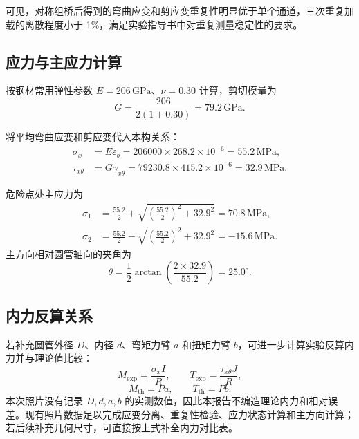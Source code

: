 \documentclass[UTF8,a4paper,10pt]{ctexart}
\begin{document}
可见，对称组桥后得到的弯曲应变和剪应变重复性明显优于单个通道，三次重复加载的离散程度小于 1\%，满足实验指导书中对重复测量稳定性的要求。

\subsection{应力与主应力计算}

按钢材常用弹性参数 $E=206\,\mathrm{GPa}$、$\nu=0.30$ 计算，剪切模量为
\begin{equation}
    G=\frac{206}{2(1+0.30)}=79.2\,\mathrm{GPa}.
\end{equation}

将平均弯曲应变和剪应变代入本构关系：
\begin{align}
    \sigma_x &= E\varepsilon_b
    =206000\times 268.2\times10^{-6}
    =55.2\,\mathrm{MPa},\\
    \tau_{x\theta} &= G\gamma_{x\theta}
    =79230.8\times 415.2\times10^{-6}
    =32.9\,\mathrm{MPa}.
\end{align}

危险点处主应力为
\begin{align}
    \sigma_1
    &=\frac{55.2}{2}+\sqrt{\left(\frac{55.2}{2}\right)^2+32.9^2}
    =70.8\,\mathrm{MPa},\\
    \sigma_2
    &=\frac{55.2}{2}-\sqrt{\left(\frac{55.2}{2}\right)^2+32.9^2}
    =-15.6\,\mathrm{MPa}.
\end{align}
主方向相对圆管轴向的夹角为
\begin{equation}
    \theta=\frac12\arctan\left(\frac{2\times32.9}{55.2}\right)
    =25.0^\circ .
\end{equation}

\subsection{内力反算关系}

若补充圆管外径 $D$、内径 $d$、弯矩力臂 $a$ 和扭矩力臂 $b$，可进一步计算实验反算内力并与理论值比较：
\begin{equation}
    M_{\mathrm{exp}}=\frac{\sigma_x I}{R},\qquad
    T_{\mathrm{exp}}=\frac{\tau_{x\theta} J}{R},
\end{equation}
\begin{equation}
    M_{\mathrm{th}}=Pa,\qquad T_{\mathrm{th}}=Pb.
\end{equation}
本次照片没有记录 $D,d,a,b$ 的实测数值，因此本报告不编造理论内力和相对误差。现有照片数据足以完成应变分离、重复性检验、应力状态计算和主方向计算；若后续补充几何尺寸，可直接按上式补全内力对比表。
\end{document}
